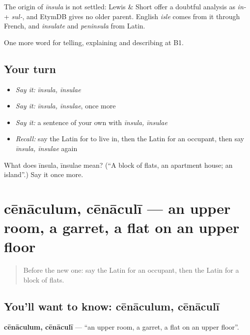 \begin{cousinweb}
The origin of \emph{īnsula} is not settled: Lewis \& Short offer a doubtful analysis as \emph{in-} + \emph{sul-}, and EtymDB gives no older parent. English \emph{isle} comes from it through French, and \emph{insulate} and \emph{peninsula} from Latin.
\end{cousinweb}

\begin{grammarlens}[title={What you've built}]
One more word for telling, explaining and describing at B1.
\end{grammarlens}

\subsection*{Your turn}
\begin{itemize}
\raggedright
  \item \emph{Say it:} \emph{īnsula, īnsulae}
  \item \emph{Say it:} \emph{īnsula, īnsulae}, once more
  \item \emph{Say it:} a sentence of your own with \emph{īnsula, īnsulae}
  \item \emph{Recall:} say the Latin for to live in, then the Latin for an occupant, then say \emph{īnsula, īnsulae} again
\end{itemize}

\begin{tcolorbox}[breakable,colback=teal!4,colframe=teal!35!black,title={Before you move on}]
What does īnsula, īnsulae mean? (\textquotedblleft{}A block of flats, an apartment house; an island\textquotedblright{}.) Say it once more.
\end{tcolorbox}
\section[cēnāculum, cēnāculī]{cēnāculum, cēnāculī — an upper room, a garret, a flat on an upper floor}

\label{lesson:LA-C457-cenaculum}



\begin{quote}
Before the new one: say the Latin for an occupant, then the Latin for a block of flats.
\end{quote}

\subsection*{You'll want to know: cēnāculum, cēnāculī}
\textbf{cēnāculum, cēnāculī} — \textquotedblleft{}an upper room, a garret, a flat on an upper floor\textquotedblright{}.

